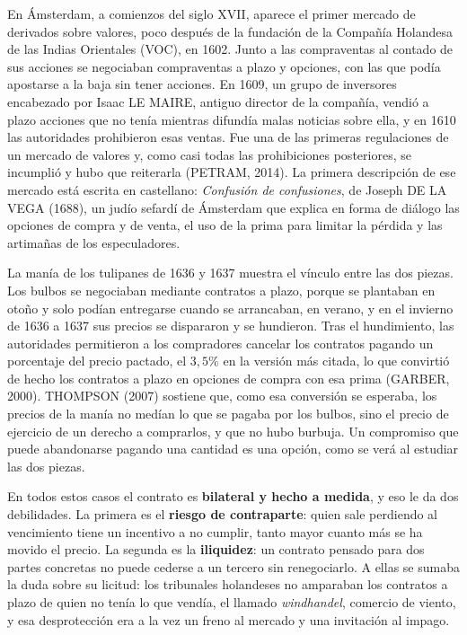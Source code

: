 \documentclass[10pt,a4paper]{article}
\begin{document}
En Ámsterdam, a comienzos del siglo XVII, aparece el primer mercado de derivados sobre valores, poco después de la fundación de la Compañía Holandesa de las Indias Orientales (VOC), en 1602. Junto a las compraventas al contado de sus acciones se negociaban compraventas a plazo y opciones, con las que podía apostarse a la baja sin tener acciones. En 1609, un grupo de inversores encabezado por Isaac LE MAIRE, antiguo director de la compañía, vendió a plazo acciones que no tenía mientras difundía malas noticias sobre ella, y en 1610 las autoridades prohibieron esas ventas. Fue una de las primeras regulaciones de un mercado de valores y, como casi todas las prohibiciones posteriores, se incumplió y hubo que reiterarla (PETRAM, 2014). La primera descripción de ese mercado está escrita en castellano: \textit{Confusión de confusiones}, de Joseph DE LA VEGA (1688), un judío sefardí de Ámsterdam que explica en forma de diálogo las opciones de compra y de venta, el uso de la prima para limitar la pérdida y las artimañas de los especuladores.

La manía de los tulipanes de 1636 y 1637 muestra el vínculo entre las dos piezas. Los bulbos se negociaban mediante contratos a plazo, porque se plantaban en otoño y solo podían entregarse cuando se arrancaban, en verano, y en el invierno de 1636 a 1637 sus precios se dispararon y se hundieron. Tras el hundimiento, las autoridades permitieron a los compradores cancelar los contratos pagando un porcentaje del precio pactado, el $3{,}5\%$ en la versión más citada, lo que convirtió de hecho los contratos a plazo en opciones de compra con esa prima (GARBER, 2000). THOMPSON (2007) sostiene que, como esa conversión se esperaba, los precios de la manía no medían lo que se pagaba por los bulbos, sino el precio de ejercicio de un derecho a comprarlos, y que no hubo burbuja. Un compromiso que puede abandonarse pagando una cantidad es una opción, como se verá al estudiar las dos piezas.

En todos estos casos el contrato es \textbf{bilateral y hecho a medida}, y eso le da dos debilidades. La primera es el \textbf{riesgo de contraparte}: quien sale perdiendo al vencimiento tiene un incentivo a no cumplir, tanto mayor cuanto más se ha movido el precio. La segunda es la \textbf{iliquidez}: un contrato pensado para dos partes concretas no puede cederse a un tercero sin renegociarlo. A ellas se sumaba la duda sobre su licitud: los tribunales holandeses no amparaban los contratos a plazo de quien no tenía lo que vendía, el llamado \textit{windhandel}, comercio de viento, y esa desprotección era a la vez un freno al mercado y una invitación al impago.
\end{document}
